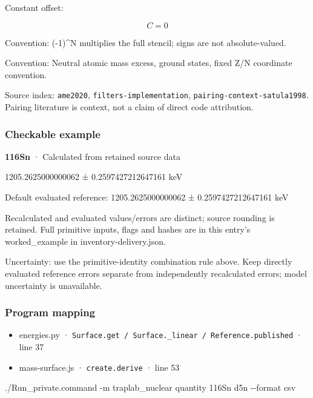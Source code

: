 \documentclass[
  11pt,
  letterpaper,
]{article}
\newenvironment{Shaded}{}{}
\newcommand{\AttributeTok}[1]{\textcolor[rgb]{0.49,0.56,0.16}{#1}}
\newcommand{\ExtensionTok}[1]{#1}
\newcommand{\NormalTok}[1]{#1}
\providecommand{\tightlist}{%
  \setlength{\itemsep}{0pt}\setlength{\parskip}{0pt}}
\begin{document}
Constant offset:

\[
C=0
\]

Convention: (-1)\^{}N multiplies the full stencil; signs are not
absolute-valued.

Convention: Neutral atomic mass excess, ground states, fixed Z/N
coordinate convention.

Source index: \texttt{ame2020}, \texttt{filters-implementation},
\texttt{pairing-context-satula1998}. Pairing literature is context, not
a claim of direct code attribution.

\subsubsection{Checkable example}\label{checkable-example-24}

\textbf{116Sn} · Calculated from retained source data

1205.2625000000062 ± 0.2597427212647161 keV

Default evaluated reference: 1205.2625000000062 ± 0.2597427212647161 keV

Recalculated and evaluated values/errors are distinct; source rounding
is retained. Full primitive inputs, flags and hashes are in this entry's
worked\_example in inventory-delivery.json.

Uncertainty: use the primitive-identity combination rule above. Keep
directly evaluated reference errors separate from independently
recalculated errors; model uncertainty is unavailable.

\subsubsection{Program mapping}\label{program-mapping-24}

\begin{itemize}
\tightlist
\item
  energies.py ·
  \texttt{Surface.get\ /\ Surface.\_linear\ /\ Reference.published} ·
  line 37
\item
  mass-surface.js · \texttt{create.derive} · line 53
\end{itemize}

\begin{Shaded}
\begin{Highlighting}[]
\ExtensionTok{./Run\_private.command} \AttributeTok{{-}m}\NormalTok{ traplab\_nuclear quantity 116Sn d5n }\AttributeTok{{-}{-}format}\NormalTok{ csv}
\end{Highlighting}
\end{Shaded}
\end{document}
